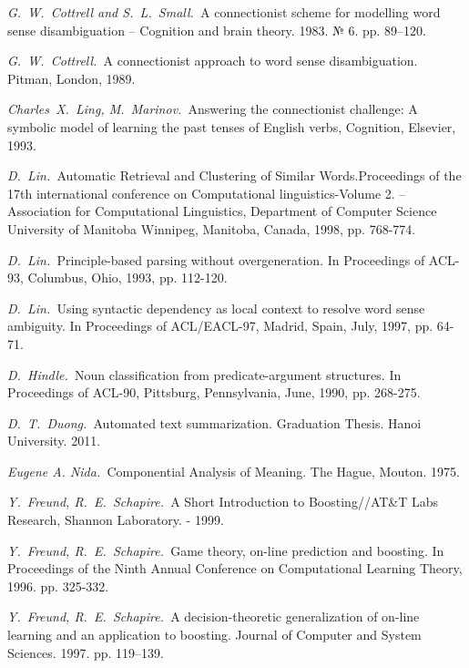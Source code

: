 \documentclass{article}
\begin{document}
\begin{articletext}
\begin{thebibliography}{9}
\textit{G.~W.~Cottrell and S.~L.~Small.~}A connectionist  scheme for modelling word  sense  disambiguation -- Cognition and brain theory. 1983. № 6. pp. 89–120. 

\textit{G.~W.~Cottrell.~}A connectionist approach to word sense disambiguation. Pitman, London, 1989.

\textit{Charles~X.~Ling, M.~Marinov.~}Answering the connectionist challenge: A symbolic model of learning the past tenses of English verbs,  Cognition, Elsevier, 1993.

\textit{D.~Lin.~}Automatic Retrieval and Clustering of Similar Words.Proceedings of the 17th international conference on Computational linguistics-Volume 2. – Association for Computational Linguistics, Department of Computer Science University of Manitoba Winnipeg, Manitoba, Canada, 1998, pp. 768-774.

\textit{D.~Lin.~}Principle-based parsing without overgeneration. In Proceedings of ACL-93, Columbus, Ohio, 1993, pp. 112-120.

\textit{D.~Lin.~}Using syntactic dependency as local context to resolve word sense ambiguity. In Proceedings of ACL/EACL-97, Madrid, Spain, July, 1997, pp. 64-71.

\textit{D.~Hindle.~}Noun classification from predicate-argument structures. In Proceedings of ACL-90, Pittsburg, Pennsylvania, June, 1990, pp. 268-275.

\textit{D.~T.~Duong.~}Automated text summarization. Graduation Thesis. Hanoi University. 2011. 

\textit{Eugene A. Nida.~}Componential Analysis of Meaning. The Hague, Mouton. 1975.

\textit{Y.~Freund, R.~E.~Schapire.~}A Short Introduction to Boosting//AT\&T Labs Research, Shannon Laboratory. - 1999.

\textit{Y.~Freund, R.~E.~Schapire.~}Game theory, on-line prediction and boosting. In Proceedings of the Ninth Annual Conference on Computational Learning Theory,  1996. pp. 325-332.

\textit{Y.~Freund, R.~E.~Schapire.~}A decision-theoretic generalization of on-line learning and an application to boosting. Journal of Computer and System Sciences. 1997. pp. 119–139.


\end{thebibliography}
\end{articletext}
\end{document}
